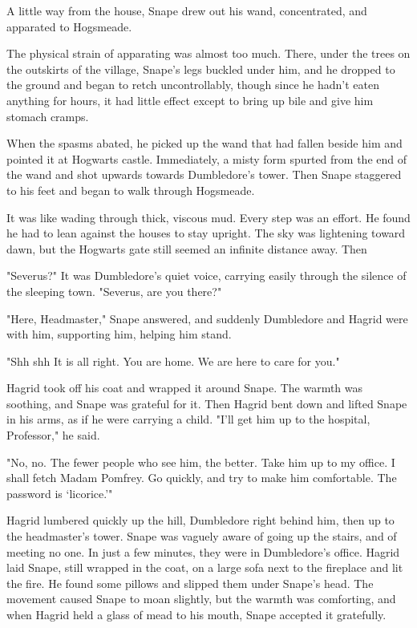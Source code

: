 A little way from the house, Snape drew out his wand, concentrated, and apparated to Hogsmeade.

The physical strain of apparating was almost too much. There, under the trees on the outskirts of the village, Snape's legs buckled under him, and he dropped to the ground and began to retch uncontrollably, though since he hadn't eaten anything for hours, it had little effect except to bring up bile and give him stomach cramps.

When the spasms abated, he picked up the wand that had fallen beside him and pointed it at Hogwarts castle. Immediately, a misty form spurted from the end of the wand and shot upwards towards Dumbledore's tower. Then Snape staggered to his feet and began to walk through Hogsmeade.

It was like wading through thick, viscous mud. Every step was an effort. He found he had to lean against the houses to stay upright. The sky was lightening toward dawn, but the Hogwarts gate still seemed an infinite distance away. Then{\el}

"Severus?" It was Dumbledore's quiet voice, carrying easily through the silence of the sleeping town. "Severus, are you there?"

"Here, Headmaster," Snape answered, and suddenly Dumbledore and Hagrid were with him, supporting him, helping him stand.

"Shh{\el} shh{\el} It is all right. You are home. We are here to care for you."

Hagrid took off his coat and wrapped it around Snape. The warmth was soothing, and Snape was grateful for it. Then Hagrid bent down and lifted Snape in his arms, as if he were carrying a child. "I'll get him up to the hospital, Professor," he said.

"No, no. The fewer people who see him, the better. Take him up to my office. I shall fetch Madam Pomfrey. Go quickly, and try to make him comfortable. The password is `licorice.'"

Hagrid lumbered quickly up the hill, Dumbledore right behind him, then up to the headmaster's tower. Snape was vaguely aware of going up the stairs, and of meeting no one. In just a few minutes, they were in Dumbledore's office. Hagrid laid Snape, still wrapped in the coat, on a large sofa next to the fireplace and lit the fire. He found some pillows and slipped them under Snape's head. The movement caused Snape to moan slightly, but the warmth was comforting, and when Hagrid held a glass of mead to his mouth, Snape accepted it gratefully.

